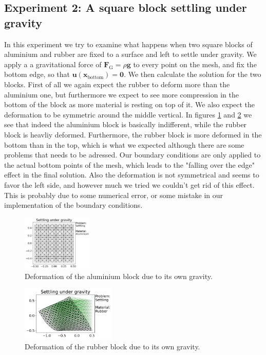 \documentclass[acmtog]{acmart}
\begin{document}
\subsection{Experiment 2: A square block settling under gravity}
In this experiment we try to examine what happens when two square blocks of aluminium and rubber are fixed to a surface and left to settle under gravity. We apply a a gravitational force of $\boldsymbol F_\mathrm{G}  = \rho \boldsymbol g$ to every point on the mesh, and fix the bottom edge, so that $\boldsymbol u(\boldsymbol x_\mathrm{bottom} ) = \boldsymbol 0$. We then calculate the solution for the two blocks. First of all we again expect the rubber to deform more than the aluminium one, but furthermore we expect to see more compression in the bottom of the block as more material is resting on top of it. We also expect the deformation to be symmetric around the middle vertical. In figures \ref{fig:w5exp2_0} and \ref{fig:w5exp2_1} we see that indeed the aluminium block is basically indifferent, while the rubber block is heavliy deformed. Furthermore, the rubber block is more deformed in the bottom than in the top, which is what we expected although there are some problems that needs to be adressed. Our boundary conditions are only applied to the actual bottom points of the mesh, which leads to the "falling over the edge" effect in the final solution. Also the deformation is not symmetrical and seems to favor the left side, and however much we tried we couldn't get rid of this effect. This is probably due to some numerical error, or some mistake in our implementation of the boundary conditions.
%
\graphicspath{{Images/Week5/exp2/}}
\begin{figure}[H]
  \centering
  \includegraphics[width = 0.3\textwidth]{exp2_0.png}
  \caption{Deformation of the aluminium block due to its own gravity.\label{fig:w5exp2_0}}
\end{figure}
\begin{figure}[H]
  \centering
  \includegraphics[width = 0.4\textwidth]{exp2_1.png}
  \caption{Deformation of the rubber block due to its own gravity.\label{fig:w5exp2_1}}
\end{figure}
\end{document}
